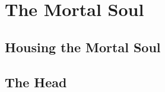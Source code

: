 
\chapter{The Mortal Soul} %
\label{cha:the_mortal_soul}

\section{Housing the Mortal Soul} %
\label{sec:housing_the_mortal_soul}




\section{The Head} %
\label{sec:the_head}




